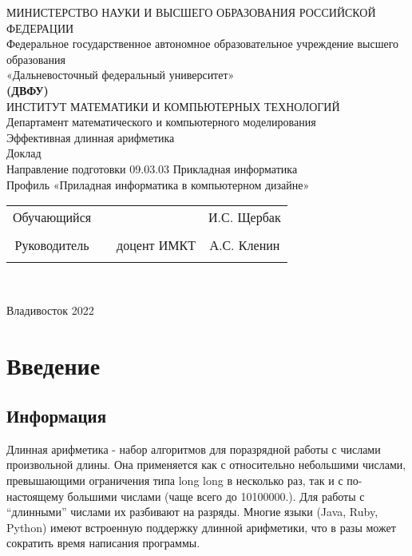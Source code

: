 \documentclass[a4paper]{article}
\begin{document}
 
 
\begin{center}
\hfill \break
\large{МИНИСТЕРСТВО НАУКИ И ВЫСШЕГО ОБРАЗОВАНИЯ РОССИЙСКОЙ ФЕДЕРАЦИИ}\\
\footnotesize{Федеральное государственное автономное образовательное учреждение высшего образования}\\ 
\footnotesize{«Дальневосточный федеральный университет»}\\
\small{\textbf{(ДВФУ)}}\\
\hfill \break
\normalsize{ИНСТИТУТ МАТЕМАТИКИ И КОМПЬЮТЕРНЫХ ТЕХНОЛОГИЙ}\\
 \hfill \break
\normalsize{Департамент математического и компьютерного моделирования}\\
\hfill\break
\hfill \break
\hfill \break
\hfill \break
\large{Эффективная длинная арифметика}\\
\hfill \break
\hfill \break
\hfill \break
\normalsize{Доклад\\
\hfill \break
Направление подготовки 09.03.03 Прикладная информатика\\
\hfill \break
Профиль «Приладная информатика в компьютерном дизайне»}\\
\hfill \break
\hfill \break
\end{center}
 
\normalsize{} \hfill \break
\hfill \break
 
\normalsize{ 
\begin{tabular}{cccc}
Обучающийся & \underline{\hspace{3cm}} & &И.С. Щербак \\\\
Руководитель & \underline{\hspace{3cm}}& доцент ИМКТ &А.С. Кленин \\\\
\end{tabular}
}\\
\hfill \break
\hfill \break
\begin{center} Владивосток 2022 \end{center}
\thispagestyle{empty} 
 
\newpage
     
    \tableofcontents 
\newpage

\section{Введение}
\subsection{Информация}
Длинная арифметика - набор алгоритмов для поразрядной работы с числами произвольной длины. Она применяется как с относительно небольшими числами, превышающими ограничения типа long long в несколько раз, так и с по-настоящему большими числами (чаще всего до 10100000.). Для работы с “длинными” числами их разбивают на разряды.
Многие языки (Java, Ruby, Python) имеют встроенную поддержку длинной арифметики, что в разы может сократить время написания программы.
\end{document}
